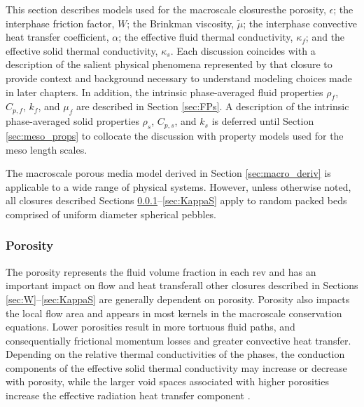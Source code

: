 This section describes models used for the macroscale closures\mdash the porosity, \(\epsilon\); the interphase friction factor, \(W\); the Brinkman viscosity, \(\tilde{\mu}\); the interphase convective heat transfer coefficient, \(\alpha\); the effective fluid thermal conductivity, \(\kappa_f\); and the effective solid thermal conductivity, \(\kappa_s\). Each discussion coincides with a description of the salient physical phenomena represented by that closure to provide context and background necessary to understand modeling choices made in later chapters. In addition, the intrinsic phase-averaged fluid properties \(\rho_f\), \(C_{p,f}\), \(k_f\), and \(\mu_f\) are described in Section \ref{sec:FPs}. A description of the intrinsic phase-averaged solid properties \(\rho_s\), \(C_{p,s}\), and \(k_s\) is deferred until Section \ref{sec:meso_props} to collocate the discussion with property models used for the meso length scales.

The macroscale porous media model derived in Section \ref{sec:macro_deriv} is applicable to a wide range of physical systems. However, unless otherwise noted, all closures described Sections \ref{sec:Porosity}--\ref{sec:KappaS} apply to random packed beds comprised of uniform diameter spherical pebbles.

\subsubsection{Porosity}
\label{sec:Porosity}

The porosity represents the fluid volume fraction in each \gls{rev} and has an important impact on flow and heat transfer\mdash all other closures described in Sections \ref{sec:W}--\ref{sec:KappaS} are generally dependent on porosity. Porosity also impacts the local flow area and appears in most kernels in the macroscale conservation equations. Lower porosities result in more tortuous fluid paths, and consequentially frictional momentum losses and greater convective heat transfer. Depending on the relative thermal conductivities of the phases, the conduction components of the effective solid thermal conductivity may increase or decrease with porosity, while the larger void spaces associated with higher porosities increase the effective radiation heat transfer component \cite{you}. 

